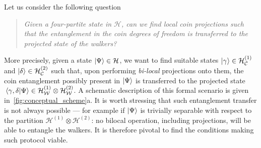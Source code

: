 \documentclass[
	aps, pra,
	superscriptaddress, twocolumn,
	floatfix,
	10pt
]{revtex4-1}
\newcommand{\on}[1]{\operatorname{#1}}
\newcommand{\parTitle}[1]{\noindent{\color{Mahogany}(\emph{#1})}}
\newcommand{\calC}{{\mathcal{C}}}
\newcommand{\calH}{{\mathcal{H}}}
\newcommand{\calW}{{\mathcal{W}}}
\newcommand{\commale}[1]{{\textcolor{red} {\it{[Note (Ale): #1]}}}}
\renewcommand{\parTitle}[1]{}
\begin{document}
\parTitle{Problem statement}
Let us consider the following question
\begin{quote}
    \textit{Given a four-partite state in $\calH$, can we find local coin projections such that the entanglement in the coin degrees of freedom is transferred to the projected state of the walkers?}
\end{quote}%
More precisely, given a state $\ket\Psi\in\calH$, we want to find suitable states $\ket{\gamma}\in\calH^{(1)}_{\calC}$ and $\ket\delta\in\calH^{(2)}_{\calC}$ such that, upon performing {\it bi-local} projections onto them, the coin entanglement possibly present in $\ket\Psi$ is transferred to the projected state
$\braket*{\gamma,\delta}{\Psi}\in\calH^{(1)}_{\calW}\otimes\calH^{(2)}_{\calW}$.
A schematic description of this formal scenario is given in~\cref{fig:conceptual_scheme}a. %
It is worth stressing that such entanglement transfer is not always possible --- for example if $\ket\Psi$ is trivially separable with respect to the partition $\calH^{(1)}\otimes\calH^{(2)}$: no bilocal operation, including projections, will be able to entangle the walkers. It is therefore pivotal to find the conditions making such protocol viable.

\end{document}
